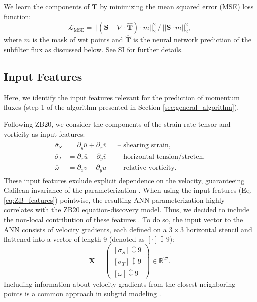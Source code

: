 \documentclass[draft]{agujournal2019}
\begin{document}
We learn the components of $\mathbf{T}$ by minimizing the  mean squared error (MSE) loss function:
\begin{equation}
\mathcal{L}_{\mathrm{MSE}} = ||(\mathbf{S} - \nabla \cdot \widehat{\mathbf{T}}) \cdot m ||_2^2 ~ / ~||\mathbf{S} \cdot m||_2^2, \label{eq:mse_loss}
\end{equation}
where $m$ is the mask of wet points and $\widehat{\mathbf{T}}$ is the neural network prediction of the subfilter flux as discussed below. See SI for further details.  

\subsection{Input Features}
Here, we identify the input features relevant for the prediction of momentum fluxes (step 1 of the algorithm presented in Section \ref{sec:general_algorithm}).

Following ZB20, we consider the components of the strain-rate tensor and vorticity as input features:
\begin{gather}
    \begin{aligned}
        \overline{\sigma}_S & = \partial_y \overline{u} + \partial_x \overline{v} && \text{-- shearing strain,} \\
        \overline{\sigma}_T & = \partial_x \overline{u} - \partial_y \overline{v} && \text{-- horizontal tension/stretch,} \\
        \overline{\omega} & = \partial_x \overline{v} - \partial_y \overline{u} && \text{-- relative vorticity.}
    \end{aligned} \label{eq:ZB_features}
\end{gather}
These input features exclude explicit dependence on the velocity, guaranteeing Galilean invariance of the parameterization \cite{srinivasan2024turbulence,pope1975more, lund1993parameterization, ling2016reynolds}. When using the input features (Eq. \eqref{eq:ZB_features}) pointwise, the resulting ANN parameterization highly correlates with the ZB20 equation-discovery model. Thus, we decided to include the non-local contribution of these features \cite{srinivasan2024turbulence}. To do so, the input vector to the ANN consists of velocity gradients, each defined on a $3 \times 3$ horizontal stencil and flattened into a vector of length 9 (denoted as $\left[ \cdot \right]{\updownarrow \scriptstyle 9}$):
\begin{equation}
    \mathbf{X} =
    \begin{pmatrix}
        \left[ \overline{\sigma}_S \right]{\updownarrow \scriptstyle 9}  \\
        \left[ \overline{\sigma}_T \right]{\updownarrow \scriptstyle 9} \\
        \left[ \overline{\omega} \right]{\updownarrow \scriptstyle 9}
    \end{pmatrix} \in \mathbb{R}^{27}. \label{eq:stack_features}
\end{equation}
Including information about velocity gradients from the closest neighboring points is a common approach in subgrid modeling \cite{maulik2017neural, maulik2019subgrid, pawar2020priori, wang2021artificial, wang2022constant, gultekin2024analysis}.
\end{document}
